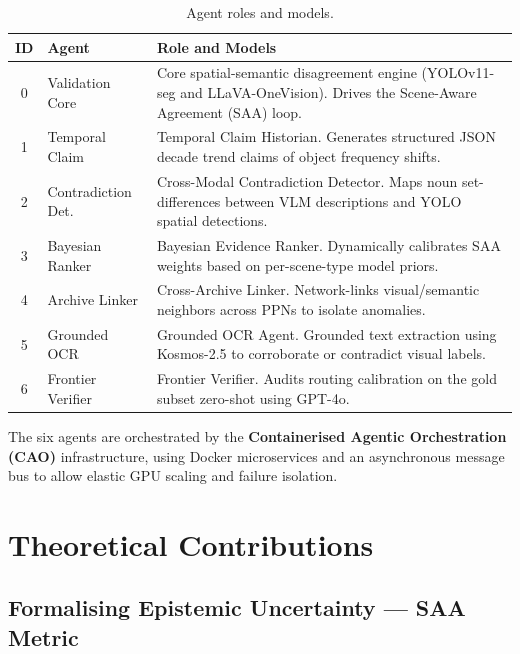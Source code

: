 \documentclass[11pt,a4paper]{article}
\theoremstyle{plain}
\begin{document}
\begin{table}[h]
\centering
\caption{Agent roles and models.}
\renewcommand{\arraystretch}{1.3}
\begin{tabularx}{\linewidth}{clX}
\toprule
\textbf{ID} & \textbf{Agent} & \textbf{Role and Models} \\
\midrule
0 & Validation Core      & Core spatial-semantic disagreement engine (YOLOv11-seg and LLaVA-OneVision). Drives the Scene-Aware Agreement (SAA) loop. \\
1 & Temporal Claim       & Temporal Claim Historian. Generates structured JSON decade trend claims of object frequency shifts. \\
2 & Contradiction Det.   & Cross-Modal Contradiction Detector. Maps noun set-differences between VLM descriptions and YOLO spatial detections. \\
3 & Bayesian Ranker      & Bayesian Evidence Ranker. Dynamically calibrates SAA weights based on per-scene-type model priors. \\
4 & Archive Linker       & Cross-Archive Linker. Network-links visual/semantic neighbors across PPNs to isolate anomalies. \\
5 & Grounded OCR         & Grounded OCR Agent. Grounded text extraction using Kosmos-2.5 to corroborate or contradict visual labels. \\
6 & Frontier Verifier    & Frontier Verifier. Audits routing calibration on the gold subset zero-shot using GPT-4o. \\
\bottomrule
\end{tabularx}
\end{table}

The six agents are orchestrated by the \textbf{Containerised Agentic Orchestration (CAO)} infrastructure, using Docker microservices and an asynchronous message bus to allow elastic GPU scaling and failure isolation.

\section{Theoretical Contributions}

\subsection{Formalising Epistemic Uncertainty — SAA Metric}
\end{document}
